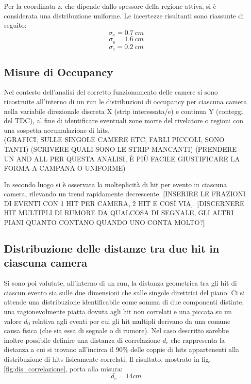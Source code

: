 \documentclass[8pt]{extarticle}
\begin{document}
Per la coordinata z, che dipende dallo spessore della regione attiva, si è considerata una distribuzione uniforme. Le incertezze risultanti sono riassunte di seguito:\\

\[ \sigma_x = 0.7 \ cm \]
\[ \sigma_y = 1.6 \ cm \]
\[ \sigma_z = 0.2 \ cm \]

\subsection{Misure di Occupancy}
Nel contesto dell'analisi del  corretto funzionamento delle camere si sono ricostruite all'interno di un run le distribuzioni di occupancy per ciascuna camera nella variabile direzionale discreta X (strip interessata/e) e continua Y (conteggi del TDC), al fine di identificare eventuali zone morte del rivelatore o regioni con una sospetta accumulazione di hits.\\
(GRAFICI, SULLE SINGOLE CAMERE ETC, FARLI PICCOLI, SONO TANTI)
(SCRIVERE QUALI SONO LE STRIP MANCANTI)
(PRENDERE UN AND ALL PER QUESTA ANALISI, È PIÙ FACILE GIUSTIFICARE LA FORMA A CAMPANA O UNIFORME)

In secondo luogo si è osservata la molteplicità di hit per evento in ciascuna camera, rilevando un trend rapidamente decrescente. [INSERIRE LE FRAZIONI DI EVENTI CON 1 HIT PER CAMERA, 2 HIT E COSÌ VIA]. 
[DISCERNERE HIT MULTIPLI DI RUMORE DA QUALCOSA DI SEGNALE, GLI ALTRI PIANI QUANTO CONTANO QUANDO UNO CONTA MOLTO?]

\subsection{Distribuzione delle distanze tra due hit in ciascuna camera} \label{subsec:dis_corr}
Si sono poi valutate, all'interno di un run, la distanza geometrica tra gli hit di ciascun evento  sia sulle due dimensioni che sulle singole direttrici del piano. Ci si attende una distribuzione identificabile come somma di due componenti distinte, una ragionevolmente piatta dovuta agli hit non correlati e una piccata su un valore $d_0$ relativa agli eventi per cui gli hit multipli derivano da una comune causa fisica (che sia essa di segnale o di rumore). 
Nel caso descritto sarebbe inoltre possibile definire una distanza di correlazione $d_c$ che rappresenta la distanza a cui si trovano all'incirca il 90\% delle coppie di hits appartenenti alla distribuzione di hits fisicamente correlati. Il risultato, mostrato in fig. \ref{fig:dis_correlazione}, porta alla misura: \\
\[ d_c = 14 cm \]
\end{document}
